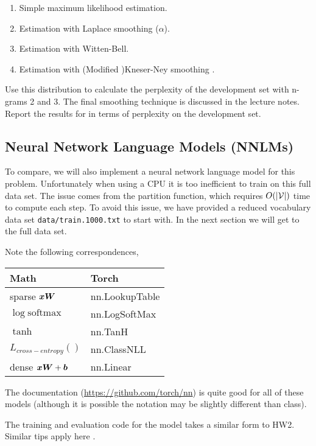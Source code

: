 \documentclass[11pt]{article}
\begin{document}
\begin{enumerate}
\item Simple maximum likelihood estimation. 
\item Estimation with Laplace smoothing ($\alpha$).
\item Estimation with Witten-Bell.
\item Estimation with (Modified )Kneser-Ney smoothing . 
\end{enumerate}

Use this distribution to calculate the perplexity of the development
set with n-grams 2 and 3. The final smoothing technique is
discussed in the lecture notes. Report the results for in terms of
perplexity on the development set.

\subsection{Neural Network Language Models (NNLMs)}

To compare, we will also implement a neural network language model for
this problem. Unfortunately when using a CPU it is too inefficient to
train on this full data set. The issue comes from the partition
function, which requires $O(|\mathcal{V}|)$ time to compute each step. To
avoid this issue, we have provided a reduced vocabulary data set
\texttt{data/train.1000.txt} to start with. In the next section we 
will get to the full data set.

Note the following correspondences,

\begin{center}
  \begin{tabular}{ll}
    \toprule
    Math & Torch \\
    \midrule 
    sparse $\boldsymbol{x} \boldsymbol{W}$ & nn.LookupTable \\ 
    $\log \mathrm{softmax}$ & nn.LogSoftMax \\ 
    $\tanh $ & nn.TanH \\ 
    $L_{cross-entropy}()$ & nn.ClassNLL \\ 
    dense $\boldsymbol{x} \boldsymbol{W} + \boldsymbol{b}$ & nn.Linear \\ 
    \bottomrule
  \end{tabular}
\end{center}
The documentation (\url{https://github.com/torch/nn}) is quite good
for all of these models (although it is possible the notation may be
slightly different than class).

The training and evaluation code for the model takes a similar form to
HW2. Similar tips apply here .
 
\end{document}
